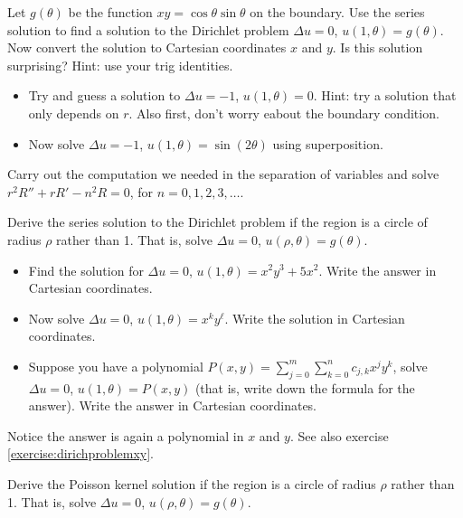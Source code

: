 \documentclass{ximera}
\begin{document}
\begin{exercise} \label{exercise:dirichproblemxy}
    Let $g(\theta)$ be the function $xy = \cos \theta \sin \theta$ on the boundary.  Use the series solution to find a solution to the Dirichlet problem $\Delta u = 0$, $u(1,\theta) = g(\theta)$.  Now convert the solution to Cartesian coordinates $x$ and $y$.  Is this solution surprising?  Hint: use your trig identities.
\end{exercise}

\begin{exercise}%
    \begin{itemize}
        \item Try and guess a solution to $\Delta u = -1$, $u(1,\theta) = 0$. Hint: try a solution that only depends on $r$.  Also first, don't worry eabout the boundary condition.
        \item Now solve $\Delta u = -1$, $u(1,\theta) = \sin(2\theta)$ using superposition.
    \end{itemize}
\end{exercise}

\begin{exercise}
    Carry out the computation we needed in the separation of variables and solve $r^2 R'' + r R' - n^2 R = 0$, for $n=0,1,2,3,\ldots$.
\end{exercise}

\begin{exercise}%
    Derive the series solution to the Dirichlet problem if the region is a circle of radius $\rho$ rather than 1. That is, solve $\Delta u = 0$, $u(\rho,\theta) = g(\theta)$. 
\end{exercise}

\begin{exercise}%
    \begin{itemize}
        \item Find the solution for $\Delta u = 0$, $u(1,\theta) = x^2y^3 + 5 x^2$.  Write the answer in Cartesian coordinates.
        \item Now solve $\Delta u = 0$, $u(1,\theta) = x^k y^\ell$. Write the solution in Cartesian coordinates.
        \item Suppose you have a polynomial $P(x,y) = \sum_{j=0}^m \sum_{k=0}^n c_{j,k} x^j y^k$, solve $\Delta u = 0$, $u(1,\theta) = P(x,y)$ (that is, write down the formula for the answer).  Write the answer in Cartesian coordinates.
    \end{itemize}
        Notice the answer is again a polynomial in $x$ and $y$. See also exercise \ref{exercise:dirichproblemxy}.
\end{exercise}

\begin{exercise}%
    Derive the Poisson kernel solution if the region is a circle of radius $\rho$ rather than 1.  That is, solve $\Delta u = 0$, $u(\rho,\theta) = g(\theta)$.
\end{exercise}
%
\end{document}
